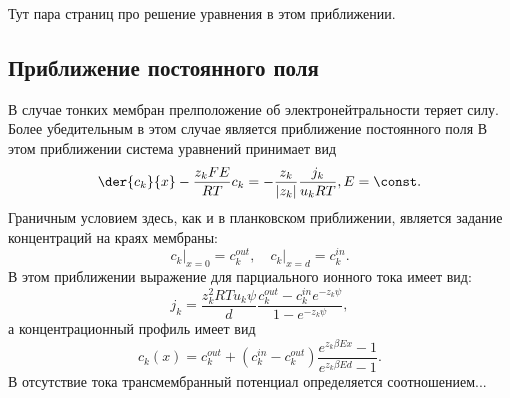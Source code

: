 \documentclass{hedwork}
\begin{document}
    Тут пара страниц про решение уравнения в этом приближении.

    \subsection{Приближение постоянного поля}
    В случае тонких мембран прелположение об электронейтральности теряет силу.
    Более убедительным в этом случае является приближение постоянного поля
    В этом приближении система уравнений принимает вид
    \[
        \der{c_k}{x} - \frac{z_kFE}{RT}c_k = -\frac{z_k}{|z_k|}\frac{j_k}{u_kRT},
        E = \const.
    \]
    Граничным условием здесь, как и в планковском приближении, является задание
    концентраций на краях мембраны:
    \[
        \left.c_k\right|_{x=0} = c_k^{out},\quad \left.c_k\right|_{x=d} = c_k^{in}.
    \]
    В этом приближении выражение для парциального ионного тока имеет вид:
    \[
        j_k = \frac{z_k^2RTu_k\psi}{d}\frac{c_k^{out} - c_k^{in}e^{-z_k\psi}}{1 - e^{-z_k\psi}},
    \]
    а концентрационный профиль имеет вид
    \[
        c_k(x) = c_k^{out} + (c_k^{in}-c_k^{out})\frac{e^{z_k\beta Ex} - 1}{e^{z_k\beta Ed} - 1}.
    \]
    В отсутствие тока трансмембранный потенциал определяется соотношением...
\end{document}
